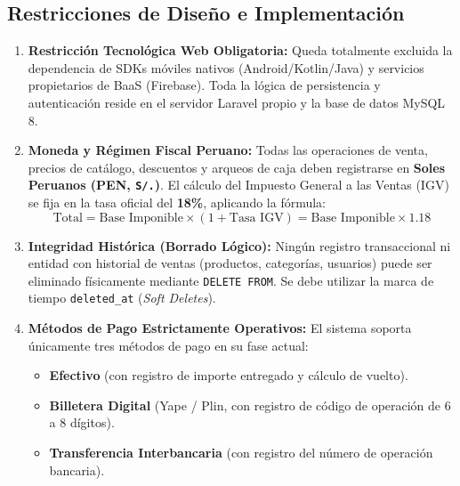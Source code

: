 \subsection{Restricciones de Diseño e Implementación}
\begin{enumerate}[leftmargin=*]
    \item \textbf{Restricción Tecnológica Web Obligatoria:} Queda totalmente excluida la dependencia de SDKs móviles nativos (Android/Kotlin/Java) y servicios propietarios de BaaS (Firebase). Toda la lógica de persistencia y autenticación reside en el servidor Laravel propio y la base de datos MySQL 8.
    \item \textbf{Moneda y Régimen Fiscal Peruano:} Todas las operaciones de venta, precios de catálogo, descuentos y arqueos de caja deben registrarse en \textbf{Soles Peruanos (PEN, \texttt{S/.})}. El cálculo del Impuesto General a las Ventas (IGV) se fija en la tasa oficial del \textbf{18\%}, aplicando la fórmula:
    \begin{equation}
        \text{Total} = \text{Base Imponible} \times (1 + \text{Tasa IGV}) = \text{Base Imponible} \times 1.18
    \end{equation}
    \item \textbf{Integridad Histórica (Borrado Lógico):} Ningún registro transaccional ni entidad con historial de ventas (productos, categorías, usuarios) puede ser eliminado físicamente mediante \texttt{DELETE FROM}. Se debe utilizar la marca de tiempo \texttt{deleted\_at} (\textit{Soft Deletes}).
    \item \textbf{Métodos de Pago Estrictamente Operativos:} El sistema soporta únicamente tres métodos de pago en su fase actual:
    \begin{itemize}
        \item \textbf{Efectivo} (con registro de importe entregado y cálculo de vuelto).
        \item \textbf{Billetera Digital} (Yape / Plin, con registro de código de operación de 6 a 8 dígitos).
        \item \textbf{Transferencia Interbancaria} (con registro del número de operación bancaria).
    \end{itemize}
\end{enumerate}

